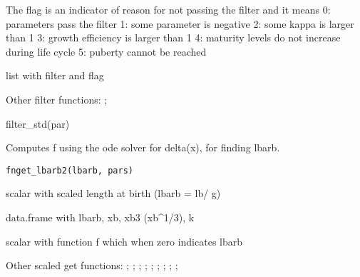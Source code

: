 \documentclass[a4paper]{book}
\begin{document}
%
\begin{Details}\relax
The flag is an indicator of reason for not passing the filter and it means
0: parameters pass the filter
1: some parameter is negative
2: some kappa is larger than 1
3: growth efficiency is larger than 1
4: maturity levels do not increase during life cycle
5: puberty cannot be reached
\end{Details}
%
\begin{Value}
list with filter and flag
\end{Value}
%
\begin{SeeAlso}\relax
Other filter functions: ;
\end{SeeAlso}
%
\begin{Examples}
\begin{ExampleCode}
filter_std(par)
\end{ExampleCode}
\end{Examples}
%
\begin{Description}\relax
Computes f using the ode solver for delta(x), for finding lbarb.
\end{Description}
%
\begin{Usage}
\begin{verbatim}
fnget_lbarb2(lbarb, pars)
\end{verbatim}
\end{Usage}
%
\begin{Arguments}
\begin{ldescription}
\item[\code{lbarb}] scalar with scaled length at birth (lbarb = lb/ g)

\item[\code{pars}] data.frame with lbarb, xb, xb3 (xb\textasciicircum{}1/3), k
\end{ldescription}
\end{Arguments}
%
\begin{Value}
scalar with function f which when zero indicates lbarb
\end{Value}
%
\begin{SeeAlso}\relax
Other scaled get functions: ;
; ;
; ;
; ;
;
;
\end{SeeAlso}
\end{document}
